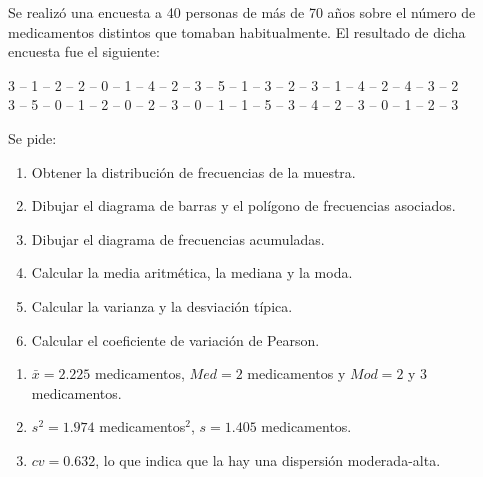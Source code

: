 
{Se realizó una encuesta a 40 personas de más de 70 años sobre el número de medicamentos distintos que tomaban habitualmente. El resultado de dicha encuesta fue el siguiente:
\begin{center}
3 -- 1 -- 2 -- 2 -- 0 -- 1 -- 4 -- 2 -- 3 -- 5 -- 1 -- 3 -- 2 -- 3 -- 1 -- 4 -- 2 -- 4 -- 3 -- 2 \\
3 -- 5 -- 0 -- 1 -- 2 -- 0 -- 2 -- 3 -- 0 -- 1 -- 1 -- 5 -- 3 -- 4 -- 2 -- 3 -- 0 -- 1 -- 2 -- 3
\end{center}
Se pide:
\begin{enumerate}
\item Obtener la distribución de frecuencias de la muestra.
\item Dibujar el diagrama de barras y el polígono de frecuencias asociados.
\item Dibujar el diagrama de frecuencias acumuladas.
\item Calcular la media aritmética, la mediana y la moda.
\item Calcular la varianza y la desviación típica.
\item Calcular el coeficiente de variación de Pearson.
\end{enumerate}
}
{\begin{enumerate}[start=4]
\item $ \bar{x} = 2.225$ medicamentos, $Med =2$ medicamentos y $Mod= 2$ y $3$ medicamentos.
\item $s^2 = 1.974$ medicamentos$^2$, $s= 1.405$ medicamentos.
\item $cv = 0.632$, lo que indica que la hay una dispersión moderada-alta.
\end{enumerate}
}
{}


